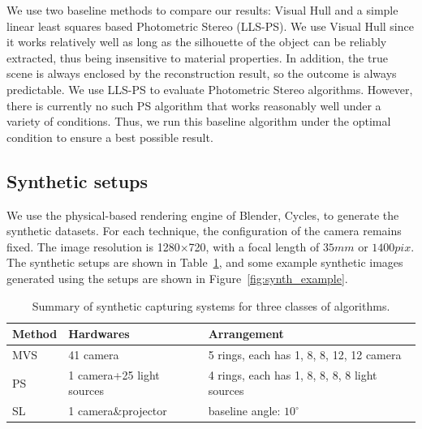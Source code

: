 We use two baseline methods to compare our results: Visual Hull and a simple linear least squares based Photometric Stereo (LLS-PS). We use Visual Hull since it works relatively well as long as the silhouette of the object can be reliably extracted, thus being insensitive to material properties. In addition, the true scene is always enclosed by the reconstruction result, so the outcome is always predictable. We use LLS-PS to evaluate Photometric Stereo algorithms. However, there is currently no such PS algorithm that works reasonably well under a variety of conditions. Thus, we run this baseline algorithm under the optimal condition to ensure a best possible result.

\subsection{Synthetic setups}
We use the physical-based rendering engine of Blender, Cycles, to generate the synthetic datasets. For each technique, the configuration of the camera remains fixed. The image resolution is 1280$\times$720, with a focal length of $35mm$ or $1400pix$. The synthetic setups are shown in Table~\ref{tab:synth_setup}, and some example synthetic images generated using the setups are shown in Figure~\ref{fig:synth_example}.
\begin{table}[!htbp]
\centering
\begin{tabular}{lll}
\toprule
Method & Hardwares & Arrangement\\
\midrule
MVS & 41 camera & 5 rings, each has 1, 8, 8, 12, 12 camera\\
PS & 1 camera+25 light sources & 4 rings, each has 1, 8, 8, 8, 8 light sources\\
SL & 1 camera\&projector & baseline angle: $10^\circ$\\
\bottomrule
\end{tabular}
\caption{Summary of synthetic capturing systems for three classes of algorithms.}
\label{tab:synth_setup}
\end{table}

